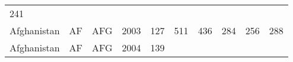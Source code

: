 \documentclass[]{article}
\begin{document}
\begin{longtable}[]{@{}llllllllll@{}}
\begin{minipage}[t]{0.09\columnwidth}
241\strut
\end{minipage}\tabularnewline
\begin{minipage}[t]{0.08\columnwidth}\raggedright\strut
Afghanistan\strut
\end{minipage} & \begin{minipage}[t]{0.04\columnwidth}\raggedright\strut
AF\strut
\end{minipage} & \begin{minipage}[t]{0.04\columnwidth}\raggedright\strut
AFG\strut
\end{minipage} & \begin{minipage}[t]{0.04\columnwidth}\raggedright\strut
2003\strut
\end{minipage} & \begin{minipage}[t]{0.08\columnwidth}\raggedright\strut
127\strut
\end{minipage} & \begin{minipage}[t]{0.09\columnwidth}\raggedright\strut
511\strut
\end{minipage} & \begin{minipage}[t]{0.09\columnwidth}\raggedright\strut
436\strut
\end{minipage} & \begin{minipage}[t]{0.09\columnwidth}\raggedright\strut
284\strut
\end{minipage} & \begin{minipage}[t]{0.09\columnwidth}\raggedright\strut
256\strut
\end{minipage} & \begin{minipage}[t]{0.09\columnwidth}\raggedright\strut
288\strut
\end{minipage}\tabularnewline
\begin{minipage}[t]{0.08\columnwidth}\raggedright\strut
Afghanistan\strut
\end{minipage} & \begin{minipage}[t]{0.04\columnwidth}\raggedright\strut
AF\strut
\end{minipage} & \begin{minipage}[t]{0.04\columnwidth}\raggedright\strut
AFG\strut
\end{minipage} & \begin{minipage}[t]{0.04\columnwidth}\raggedright\strut
2004\strut
\end{minipage} & \begin{minipage}[t]{0.08\columnwidth}\raggedright\strut
139\strut
\end{minipage} & \begin{minipage}[t]{0.09\columnwidth}\raggedright\strut

\end{minipage}
\end{longtable}
\end{document}
